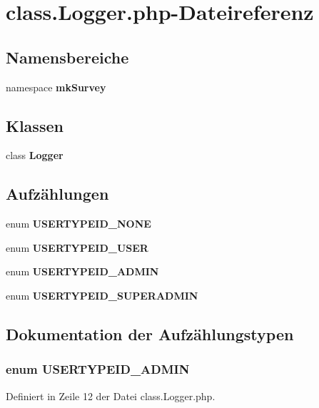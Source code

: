 \section{class.Logger.php-Dateireferenz}
\label{class_8Logger_8php}
\subsection*{Namensbereiche}
\begin{CompactItemize}
\item 
namespace {\bf mkSurvey}
\end{CompactItemize}
\subsection*{Klassen}
\begin{CompactItemize}
\item 
class {\bf Logger}
\end{CompactItemize}
\subsection*{Aufzählungen}
\begin{CompactItemize}
\item 
enum {\bf USERTYPEID\_\-NONE} 
\item 
enum {\bf USERTYPEID\_\-USER} 
\item 
enum {\bf USERTYPEID\_\-ADMIN} 
\item 
enum {\bf USERTYPEID\_\-SUPERADMIN} 
\end{CompactItemize}


\subsection{Dokumentation der Aufzählungstypen}
\subsubsection{\setlength{\rightskip}{0pt plus 5cm}enum {\bf USERTYPEID\_\-ADMIN}}\label{class_8Logger_8php_ecd1d4f709982a5a46e5c243d688c31a}




Definiert in Zeile 12 der Datei class.Logger.php.
